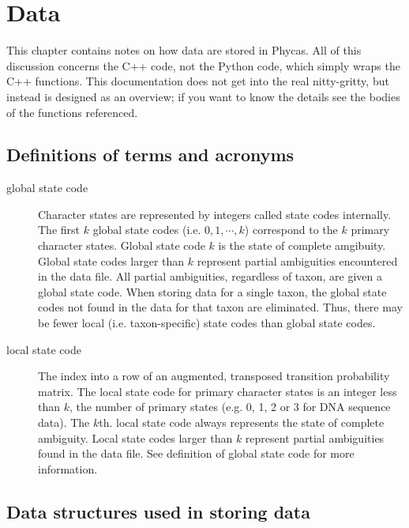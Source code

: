 \chapter{Data} 

This chapter contains notes on how data are stored in Phycas. All of this discussion concerns the C++ code, not the Python code, which simply wraps the C++ functions. This documentation does not get into the real nitty-gritty, but instead is designed as an overview; if you want to know the details see the bodies of the functions referenced.

\section{Definitions of terms and acronyms}
\begin{description}
\item[global state code] Character states are represented by integers called state codes internally. The first $k$ global state codes (i.e. $0, 1, \cdots, k$) correspond to the $k$ primary character states. Global state code $k$ is the state of complete amgibuity. Global state codes larger than $k$ represent partial ambiguities encountered in the data file. All partial ambiguities, regardless of taxon, are given a global state code. When storing data for a single taxon, the global state codes not found in the data for that taxon are eliminated. Thus, there may be fewer local (i.e. taxon-specific) state codes than global state codes.
\item[local state code] The index into a row of an augmented, transposed transition probability matrix. The local state code for primary character states is an integer less than $k$, the number of primary states (e.g. 0, 1, 2 or 3 for DNA sequence data). The $k$th. local state code always represents the state of complete ambiguity. Local state codes larger than $k$ represent partial ambiguities found in the data file. See definition of global state code for more information.
\end{description}

\section{Data structures used in storing data}

